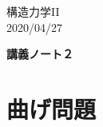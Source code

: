 \documentclass[10pt,a4j]{jarticle}
\newlength{\minitwocolumn}
\begin{document}
\newcommand{\fat}[1]{\mbox{\boldmath $#1$}}
\newcommand{\D}{\partial}
\newcommand{\w}{\omega}
\newcommand{\ga}{\alpha}
\newcommand{\gb}{\beta}
\newcommand{\gx}{\xi}
\newcommand{\gz}{\zeta}
\newcommand{\vhat}[1]{\hat{\fat{#1}}}
\newcommand{\spc}{\vspace{0.7\baselineskip}}
\newcommand{\halfspc}{\vspace{0.3\baselineskip}}

\newcommand{\twofig}[2]
 {
   \begin{figure}
     \begin{minipage}[t]{\minitwocolumn}
         \begin{center}   #1
         \end{center}
     \end{minipage}
         \hspace{\columnsep}
     \begin{minipage}[t]{\minitwocolumn}
         \begin{center} #2
         \end{center}
     \end{minipage}
   \end{figure}
 }
\begin{flushright}
	構造力学II\\
	2020/04/27
\end{flushright}
\begin{center}
	{\LARGE \bf 講義ノート２} \\
\end{center}
\setcounter{section}{1}
\section{曲げ問題}
\end{document}
